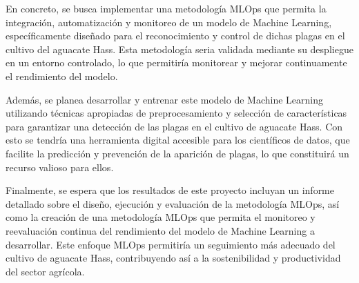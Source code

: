\begin{enumerate}
    En concreto, se busca implementar una metodología MLOps que permita la integración, automatización y monitoreo de un modelo de Machine Learning, específicamente diseñado para el reconocimiento y control de dichas plagas en el cultivo del aguacate Hass. Esta metodología seria validada mediante su despliegue en un entorno controlado, lo que permitiría monitorear y mejorar continuamente el rendimiento del modelo.

    Además, se planea desarrollar y entrenar este modelo de Machine Learning utilizando técnicas apropiadas de preprocesamiento y selección de características para garantizar una detección de las plagas en el cultivo de aguacate Hass. Con esto se tendría una herramienta digital accesible para los científicos de datos, que facilite la predicción y prevención de la aparición de plagas, lo que constituirá un recurso valioso para ellos.

    Finalmente, se espera que los resultados de este proyecto incluyan un informe detallado sobre el diseño, ejecución y evaluación de la metodología MLOps, así como la creación de una metodología MLOps que permita el monitoreo y reevaluación continua del rendimiento del modelo de Machine Learning a desarrollar. Este enfoque MLOps permitiría un seguimiento más adecuado del cultivo de aguacate Hass, contribuyendo así a la sostenibilidad y productividad del sector agrícola.
\end{enumerate}
